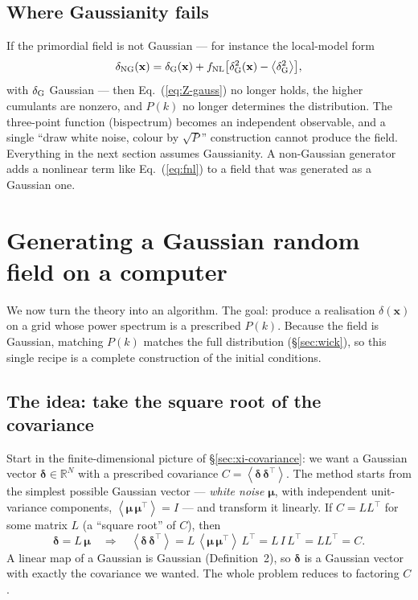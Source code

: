 \documentclass[12pt]{article}
\newcommand{\bx}{\mathbf{x}}
\newcommand{\avg}[1]{\left\langle #1 \right\rangle}
\begin{document}
\subsection{Where Gaussianity fails}
\label{sec:grf-fail}

If the primordial field is not Gaussian --- for instance the local-model
form
\begin{equation}
  \delta_{\rm NG}(\bx) = \delta_{\rm G}(\bx)
       + f_{\rm NL}\bigl[\delta_{\rm G}^2(\bx) - \avg{\delta_{\rm G}^2}\bigr],
  \label{eq:fnl}
\end{equation}
with $\delta_{\rm G}$ Gaussian --- then Eq.~(\ref{eq:Z-gauss}) no longer
holds, the higher cumulants are nonzero, and $P(k)$ no longer determines
the distribution.  The three-point function (bispectrum) becomes an
independent observable, and a single ``draw white noise, colour by
$\sqrt P$'' construction cannot produce the field.  Everything in the
next section assumes Gaussianity.  A non-Gaussian generator adds a
nonlinear term like Eq.~(\ref{eq:fnl}) to a field that was generated as a
Gaussian one.

\section{Generating a Gaussian random field on a computer}
\label{sec:generate}

We now turn the theory into an algorithm.  The goal: produce a realisation
$\delta(\bx)$ on a grid whose power spectrum is a prescribed $P(k)$.
Because the field is Gaussian, matching $P(k)$ matches the full
distribution (\S\ref{sec:wick}), so this single recipe is a complete
construction of the initial conditions.

\subsection{The idea: take the square root of the covariance}
\label{sec:gen-idea}

Start in the finite-dimensional picture of \S\ref{sec:xi-covariance}: we
want a Gaussian vector $\boldsymbol\delta \in \mathbb R^N$ with a
prescribed covariance $C = \avg{\boldsymbol\delta\,\boldsymbol\delta^\top}$.
The method starts from the simplest possible Gaussian vector ---
\emph{white noise} $\boldsymbol\mu$, with independent unit-variance
components, $\avg{\boldsymbol\mu\,\boldsymbol\mu^\top} = I$ --- and
transform it linearly.  If $C = LL^\top$ for some matrix $L$ (a ``square
root'' of $C$), then
\begin{equation}
  \boldsymbol\delta = L\,\boldsymbol\mu
  \quad\Longrightarrow\quad
  \avg{\boldsymbol\delta\,\boldsymbol\delta^\top}
     = L\,\avg{\boldsymbol\mu\,\boldsymbol\mu^\top}\,L^\top
     = L\,I\,L^\top = LL^\top = C.
  \label{eq:sqrt-cov}
\end{equation}
A linear map of a Gaussian is Gaussian (Definition~2), so
$\boldsymbol\delta$ is a Gaussian vector with exactly the covariance we
wanted.  The whole problem reduces to factoring $C$.
\end{document}
